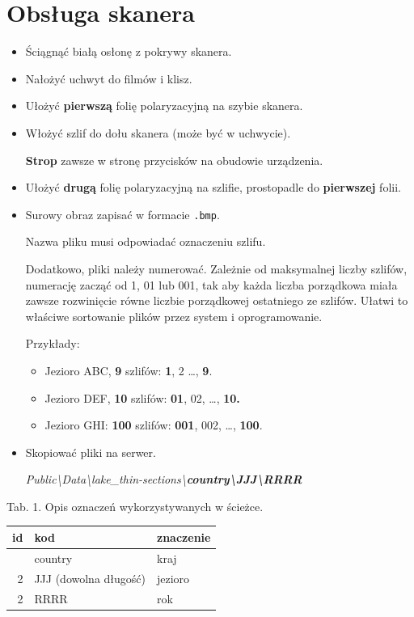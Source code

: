 \documentclass[
  letterpaper,
  DIV=11,
  numbers=noendperiod]{scrreprt}
\begin{document}
\hypertarget{obsux142uga-skanera}{%
\section{Obsługa skanera}\label{obsux142uga-skanera}}

\begin{itemize}
\item
  Ściągnąć białą osłonę z pokrywy skanera.
\item
  Nałożyć uchwyt do filmów i klisz.
\item
  Ułożyć \textbf{pierwszą} folię polaryzacyjną na szybie skanera.
\item
  Włożyć szlif do dołu skanera (może być w uchwycie).

  \textbf{Strop} zawsze w stronę przycisków na obudowie urządzenia.
\item
  Ułożyć \textbf{drugą} folię polaryzacyjną na szlifie, prostopadle do
  \textbf{pierwszej} folii.
\item
  Surowy obraz zapisać w formacie \texttt{.bmp}.

  Nazwa pliku musi odpowiadać oznaczeniu szlifu.

  Dodatkowo, pliki należy numerować. Zależnie od maksymalnej liczby
  szlifów, numerację zacząć od 1, 01 lub 001, tak aby każda liczba
  porządkowa miała zawsze rozwinięcie równe liczbie porządkowej
  ostatniego ze szlifów. Ułatwi to właściwe sortowanie plików przez
  system i oprogramowanie.

  Przykłady:

  \begin{itemize}
  \item
    Jezioro ABC, \textbf{9} szlifów: \textbf{1}, 2 \ldots, \textbf{9}.
  \item
    Jezioro DEF, \textbf{10} szlifów: \textbf{01}, 02, \ldots,
    \textbf{10.}
  \item
    Jezioro GHI: \textbf{100} szlifów: \textbf{001}, 002, \ldots,
    \textbf{100}.
  \end{itemize}
\item
  Skopiować pliki na serwer.

  \emph{Public\textbackslash Data\textbackslash lake\_thin-sections\textbackslash{}\textbf{country\textbackslash JJJ\textbackslash RRRR}}
\end{itemize}

Tab. 1. Opis oznaczeń wykorzystywanych w ścieżce.

\begin{longtable}[]{@{}rll@{}}
\toprule\noalign{}
id & kod & znaczenie \\
\midrule\noalign{}
\endhead
\bottomrule\noalign{}
\endlastfoot
1 & country & kraj \\
2 & JJJ (dowolna długość) & jezioro \\
2 & RRRR & rok \\
\end{longtable}
\end{document}
